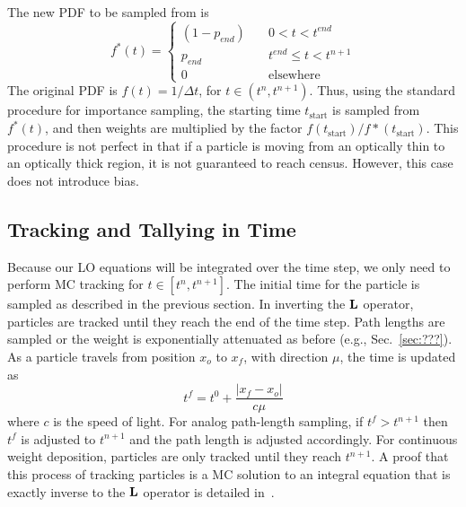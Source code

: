 The new PDF to be sampled from is
\begin{equation}
    f^*(t) = \left\{ \begin{array}{cl}
        (1 - p_{end}) &\quad 0 < t < t^{end} \\ 
        p_{end} & \quad t^{end} \leq t < t^{n+1}  \\
        0 & \quad \text{elsewhere}\end{array}  \right.
\end{equation}
The original PDF is $f(t)= 1/\Delta t$, for $t\in(t^{n},t^{n+1})$.  Thus, using the
standard procedure for importance sampling\cite{shultis_mc}, the starting time $t_{\text{start}}$ is sampled from
$f^*(t)$, and then weights are multiplied by the factor
$f(t_{\text{start}})/f*(t_{\text{start}})$.  This procedure is not perfect in that if a
particle is moving from an optically thin to an optically thick
region, it is not guaranteed to reach census. However, this case does not introduce bias.

\subsection{Tracking and Tallying in Time}

Because our LO equations will be integrated over the time step, we only need to
perform MC tracking for $t\in[t^{n},t^{n+1}]$.  
The initial time for the particle is
sampled as described in the previous section. In inverting the $\mathbf{L}$ operator, particles
are tracked until they reach the end of the time step.  Path lengths are sampled or the
weight is exponentially attenuated as before (e.g., Sec.~\ref{sec:???}).  As a particle
travels from position $x_{o}$ to $x_{f}$, with direction $\mu$, the time is updated as 
\begin{equation}
    t^{f} = t^{0} + \frac{|x_{f} - x_{o}|}{c \mu}
\end{equation}
where $c$ is the speed of light. For analog path-length sampling, if $t^{f}>t^{n+1}$ then $t^{f}$ is adjusted to $t^{n+1}$
and the path length is adjusted accordingly.  For continuous weight deposition, particles
are only tracked until they reach $t^{n+1}$.  A proof that this process of tracking
particles is a MC solution to an integral equation that is exactly inverse to the $\mathbf{L}$ operator is
detailed in~\cite{cj_thesis,shultis_paper_cj_cites???}.  

